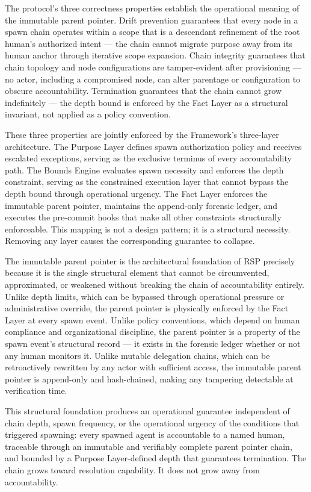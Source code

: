 The protocol's three correctness properties establish the operational meaning of the immutable parent pointer. Drift prevention guarantees that every node in a spawn chain operates within a scope that is a descendant refinement of the root human's authorized intent --- the chain cannot migrate purpose away from its human anchor through iterative scope expansion. Chain integrity guarantees that chain topology and node configurations are tamper-evident after provisioning --- no actor, including a compromised node, can alter parentage or configuration to obscure accountability. Termination guarantees that the chain cannot grow indefinitely --- the depth bound is enforced by the Fact Layer as a structural invariant, not applied as a policy convention.

These three properties are jointly enforced by the \bxthree{} Framework's three-layer architecture. The Purpose Layer defines spawn authorization policy and receives escalated exceptions, serving as the exclusive terminus of every accountability path. The Bounds Engine evaluates spawn necessity and enforces the depth constraint, serving as the constrained execution layer that cannot bypass the depth bound through operational urgency. The Fact Layer enforces the immutable parent pointer, maintains the append-only forensic ledger, and executes the pre-commit hooks that make all other constraints structurally enforceable. This mapping is not a design pattern; it is a structural necessity. Removing any layer causes the corresponding guarantee to collapse.

The immutable parent pointer is the architectural foundation of RSP precisely because it is the single structural element that cannot be circumvented, approximated, or weakened without breaking the chain of accountability entirely. Unlike depth limits, which can be bypassed through operational pressure or administrative override, the parent pointer is physically enforced by the Fact Layer at every spawn event. Unlike policy conventions, which depend on human compliance and organizational discipline, the parent pointer is a property of the spawn event's structural record --- it exists in the forensic ledger whether or not any human monitors it. Unlike mutable delegation chains, which can be retroactively rewritten by any actor with sufficient access, the immutable parent pointer is append-only and hash-chained, making any tampering detectable at verification time.

This structural foundation produces an operational guarantee independent of chain depth, spawn frequency, or the operational urgency of the conditions that triggered spawning: every spawned agent is accountable to a named human, traceable through an immutable and verifiably complete parent pointer chain, and bounded by a Purpose Layer-defined depth that guarantees termination. The chain grows toward resolution capability. It does not grow away from accountability.

